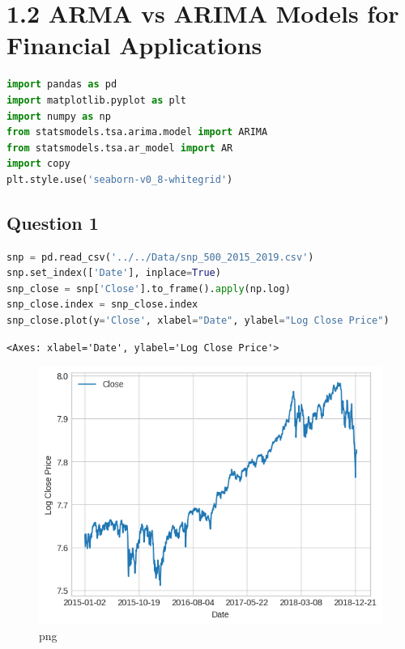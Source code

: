 \hypertarget{arma-vs-arima-models-for-financial-applications}{%
\section{1.2 ARMA vs ARIMA Models for Financial
Applications}\label{arma-vs-arima-models-for-financial-applications}}

\begin{lstlisting}[language=Python]
import pandas as pd
import matplotlib.pyplot as plt
import numpy as np
from statsmodels.tsa.arima.model import ARIMA
from statsmodels.tsa.ar_model import AR
import copy
plt.style.use('seaborn-v0_8-whitegrid')
\end{lstlisting}

\hypertarget{question-1}{%
\subsection{Question 1}\label{question-1}}

\begin{lstlisting}[language=Python]
snp = pd.read_csv('../../Data/snp_500_2015_2019.csv')
snp.set_index(['Date'], inplace=True)
snp_close = snp['Close'].to_frame().apply(np.log)
snp_close.index = snp_close.index
snp_close.plot(y='Close', xlabel="Date", ylabel="Log Close Price")
\end{lstlisting}

\begin{lstlisting}
<Axes: xlabel='Date', ylabel='Log Close Price'>
\end{lstlisting}

\begin{figure}
\centering
\includegraphics{ARMAvsARIMA_files/ARMAvsARIMA_3_1.png}
\caption{png}
\end{figure}

